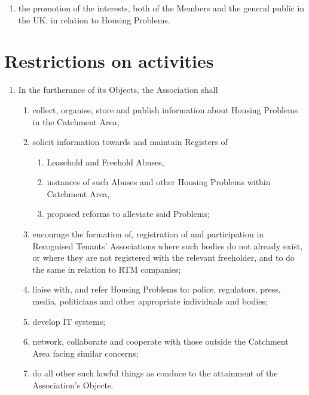 \documentclass[10pt]{mk-articles-of-association}
\newcommand{\mysection}[1]{
  \end{enumerate}
  \section*{#1}
  \begin{enumerate}[resume]
}
\newcommand{\RTA}[0]{Recognised Tenants' Association}
\newcommand{\LAFA}[0]{Leasehold and Freehold Abuses}
\begin{document}
\begin{enumerate}
\begin{enumerate}
  \item the promotion of the interests, both of the Members and the
    general public in the UK, in relation to Housing Problems.

  \end{enumerate}

\mysection{Restrictions on activities}

\item In the furtherance of its Objects, the Association shall
\begin{enumerate}

  \item collect, organise, store and publish information about
    Housing Problems in the Catchment Area;

  \item solicit information towards and maintain Registers of
    \begin{enumerate}
    \item \LAFA, \ITand
    \item instances of such Abuses and other Housing Problems within
      Catchment Area,
    \item proposed reforms to alleviate said Problems;
    \end{enumerate}

  \item encourage the formation of, registration of and participation
    in \RTA{}s where such bodies do not already exist, or where they
    are not registered with the relevant freeholder, and to do the same
    in relation to RTM companies;

  \item liaise with, and refer Housing Problems to: police, regulators,
    press, media, politicians and other appropriate individuals and bodies;

  \item develop IT systems;

  \item network, collaborate and cooperate with those outside the
    Catchment Area facing similar concerns;

  \item do all other such lawful things as conduce to the attainment
    of the Association's Objects.
\end{enumerate}


\end{enumerate}
\end{document}
